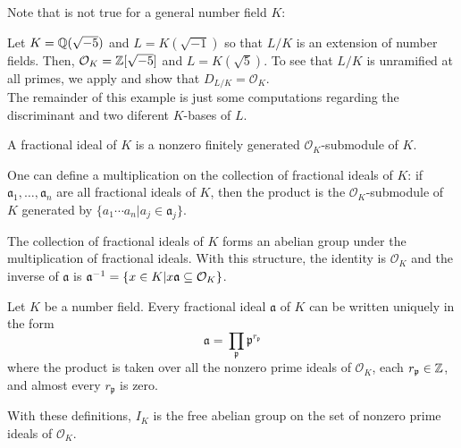 Note that  is not true for a general number field $K$:

\begin{example}
    Let $K = \mathbb{Q}(\sqrt{-5})$ and $L = K(\sqrt{-1})$ so that $L/K$ is an extension of number fields. Then, $\mathcal{O}_{K} = \mathbb{Z}[\sqrt{-5}]$ and $L = K(\sqrt{5})$. To see that $L/K$ is unramified at all primes, we apply  and show that $D_{L/K} = \mathcal{O}_{K}$.\\

    The remainder of this example is just some computations regarding the discriminant and two diferent $K$-bases of $L$.
\end{example}

\begin{definition}
    A fractional ideal of $K$ is a nonzero finitely generated $\mathcal{O}_{K}$-submodule of $K$.
\end{definition}

One can define a multiplication on the collection of fractional ideals of $K$: if $\mathfrak{a}_1, \ldots, \mathfrak{a}_n$ are all fractional ideals of $K$, then the product is the $\mathcal{O}_{K}$-submodule of $K$ generated by $\{a_1\cdots a_n | a_j \in \mathfrak{a}_j\}$.

\begin{proposition}
    The collection of fractional ideals of $K$ forms an abelian group under the multiplication of fractional ideals.
    With this structure, the identity is $\mathcal{O}_{K}$ and the inverse of $\mathfrak{a}$ is $\mathfrak{a}^{-1} = \{x \in K| x \mathfrak{a} \subseteq \mathcal{O}_{K}\}$.
\end{proposition}




\begin{proposition}
    Let $K$ be a number field. Every fractional ideal $\mathfrak{a}$ of $K$ can be written uniquely in the form 
        \[\mathfrak{a} = \prod_{\mathfrak{p}} \mathfrak{p}^{r_\mathfrak{p}}\]
    where the product is taken over all the nonzero prime ideals of $\mathcal{O}_{K}$, each $r_\mathfrak{p} \in \mathbb{Z}$, and almost every $r_\mathfrak{p}$ is zero.
\end{proposition}

\begin{remark}
    With these definitions, $I_K$ is the free abelian group on the set of nonzero prime ideals of $\mathcal{O}_{K}$.
\end{remark}

